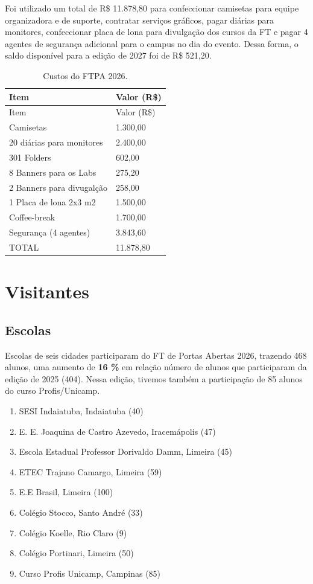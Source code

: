 \documentclass[
  letterpaper,
  DIV=11,
  numbers=noendperiod]{scrreprt}
\providecommand{\tightlist}{%
  \setlength{\itemsep}{0pt}\setlength{\parskip}{0pt}}\usepackage{longtable,booktabs,array}
\begin{document}
Foi utilizado um total de R\$ 11.878,80 para confeccionar camisetas para
equipe organizadora e de suporte, contratar serviços gráficos, pagar
diárias para monitores, confeccionar placa de lona para divulgação dos
cursos da FT e pagar 4 agentes de segurança adicional para o campus no
dia do evento. Dessa forma, o saldo disponível para a edição de 2027 foi
de R\$ 521,20.

\begin{longtable}[]{@{}ll@{}}
\caption{Custos do FTPA 2026.}\tabularnewline
\toprule\noalign{}
Item & Valor (R\$) \\
\midrule\noalign{}
\endfirsthead
\toprule\noalign{}
Item & Valor (R\$) \\
\midrule\noalign{}
\endhead
\bottomrule\noalign{}
\endlastfoot
100 Camisetas & 1.300,00 \\
20 diárias para monitores & 2.400,00 \\
301 Folders & 602,00 \\
8 Banners para os Labs & 275,20 \\
2 Banners para divugalção & 258,00 \\
1 Placa de lona 2x3 m2 & 1.500,00 \\
Coffee-break & 1.700,00 \\
Segurança (4 agentes) & 3.843,60 \\
TOTAL & 11.878,80 \\
\end{longtable}

\chapter{Visitantes}\label{visitantes-1}

\section{Escolas}\label{escolas-3}

Escolas de seis cidades participaram do FT de Portas Abertas 2026,
trazendo 468 alunos, uma aumento de \textbf{16 \%} em relação número de
alunos que participaram da edição de 2025 (404). Nessa edição, tivemos
também a participação de 85 alunos do curso Profis/Unicamp.

\begin{enumerate}
\def\labelenumi{\arabic{enumi}.}
\tightlist
\item
  SESI Indaiatuba, Indaiatuba (40)
\item
  E. E. Joaquina de Castro Azevedo, Iracemápolis (47)
\item
  Escola Estadual Professor Dorivaldo Damm, Limeira (45)
\item
  ETEC Trajano Camargo, Limeira (59)
\item
  E.E Brasil, Limeira (100)
\item
  Colégio Stocco, Santo André (33)
\item
  Colégio Koelle, Rio Claro (9)
\item
  Colégio Portinari, Limeira (50)
\item
  Curso Profis Unicamp, Campinas (85)
\end{enumerate}
\end{document}
